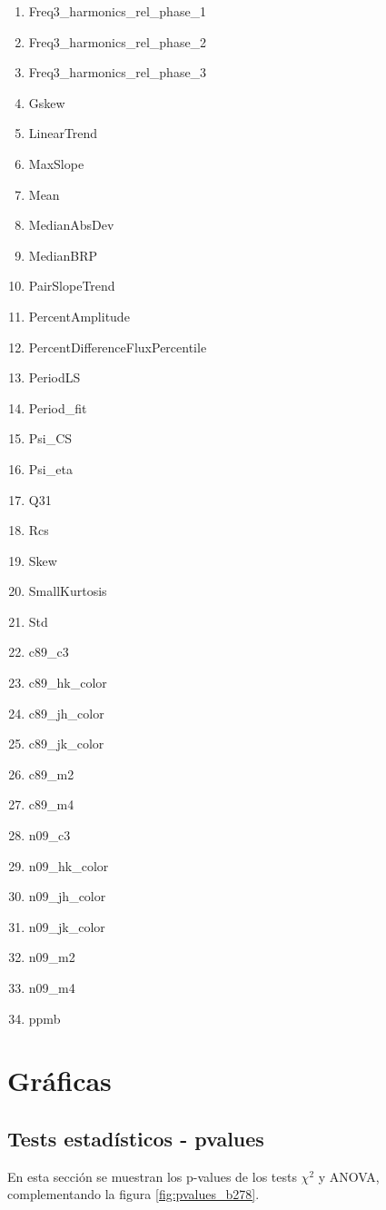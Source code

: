 \begin{appendix}
\begin{multicols}{2}
\begin{enumerate}[noitemsep]
\item Freq3\_harmonics\_rel\_phase\_1
\item Freq3\_harmonics\_rel\_phase\_2
\item Freq3\_harmonics\_rel\_phase\_3
\item Gskew
\item LinearTrend
\item MaxSlope
\item Mean
\item MedianAbsDev
\item MedianBRP
\item PairSlopeTrend
\item PercentAmplitude
\item PercentDifferenceFluxPercentile
\item PeriodLS
\item Period\_fit
\item Psi\_CS
\item Psi\_eta
\item Q31
\item Rcs
\item Skew
\item SmallKurtosis
\item Std
\item c89\_c3
\item c89\_hk\_color
\item c89\_jh\_color
\item c89\_jk\_color
\item c89\_m2
\item c89\_m4
\item n09\_c3
\item n09\_hk\_color
\item n09\_jh\_color
\item n09\_jk\_color
\item n09\_m2
\item n09\_m4
\item ppmb
\end{enumerate}
\end{multicols}

\chapter{Gráficas}\label{anexoB}

\section{Tests estadísticos - pvalues}
\label{anexo_b_pvalues}
 En esta sección se muestran los p-values de los tests $\chi^2$ y ANOVA, complementando la figura \ref{fig:pvalues_b278}.
 

\end{appendix}
